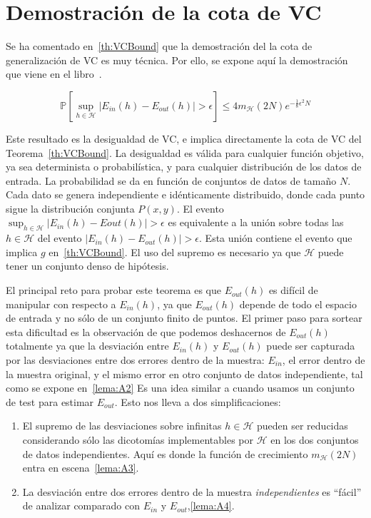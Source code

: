 \appendix
\chapter{Demostración de la cota de VC}
\label{apendice:demVC}
Se ha comentado en~\ref{th:VCBound} que la demostración del la cota de
generalización de VC es muy técnica. Por ello, se expone aquí la demostración
que viene en el libro~\citep{Abu-Mostafa:2012:LD:2207825}.

\begin{teorema}
\label{th:A1}
   \begin{displaymath}
       \mathbb{P} \left [\sup_{h \in \mathcal{H}} | E_{in}(h) - E_{out}(h) | > \epsilon \right] \leq 4m_{\mathcal{H}}(2N)e^{-\frac{1}{8} \epsilon^2 N}
   \end{displaymath}
\end{teorema}

Este resultado es la desigualdad de VC, e implica directamente la cota de VC
del Teorema~\ref{th:VCBound}. La desigualdad es válida para cualquier función
objetivo, ya sea determinista o probabilística, y para cualquier distribución
de los datos de entrada. La probabilidad se da en función de conjuntos de datos
de tamaño $N$. Cada dato se genera independiente e idénticamente distribuido,
donde cada punto sigue la distribución conjunta $P(x,y)$. El evento
$\sup_{h \in \mathcal{H}} | E_{in}(h) - E{out}(h) | > \epsilon$ es equivalente
a la unión sobre todas las $h \in \mathcal{H}$ del evento
$| E_{in}(h) - E_{out}(h) | > \epsilon$. Esta unión contiene el evento que
implica $g$ en~\ref{th:VCBound}. El uso del supremo es necesario ya que
$\mathcal{H}$ puede tener un conjunto denso de hipótesis.

El principal reto para probar este teorema es que $E_{out}(h)$ es difícil de
manipular con respecto a $E_{in}(h)$, ya que $E_{out}(h)$ depende de todo el
espacio de entrada y no sólo de un conjunto finito de puntos. El primer paso
para sortear esta dificultad es la observación de que podemos deshacernos de
$E_{out}(h)$ totalmente ya que la desviación entre $E_{in}(h)$ y $E_{out}(h)$
puede ser capturada por las desviaciones entre dos errores dentro de la muestra:
$E_{in}$, el error dentro de la muestra original, y el mismo error en otro
conjunto de datos independiente, tal como se expone en~\ref{lema:A2}
Es una idea similar a cuando usamos un conjunto de test para estimar $E_{out}$.
Esto nos lleva a dos simplificaciones:

\begin{enumerate}
    \item
    El supremo de las desviaciones sobre infinitas $h \in \mathcal{H}$ pueden ser
    reducidas considerando sólo las dicotomías implementables por $\mathcal{H}$
    en los dos conjuntos de datos independientes. Aquí es donde la función
    de crecimiento $m_{\mathcal{H}}(2N)$ entra en escena~\ref{lema:A3}.
    \item
    La desviación entre dos errores dentro de la muestra \emph{independientes}
    es ``fácil'' de analizar comparado con $E_{in}$ y $E_{out}$,\ref{lema:A4}.
\end{enumerate}


